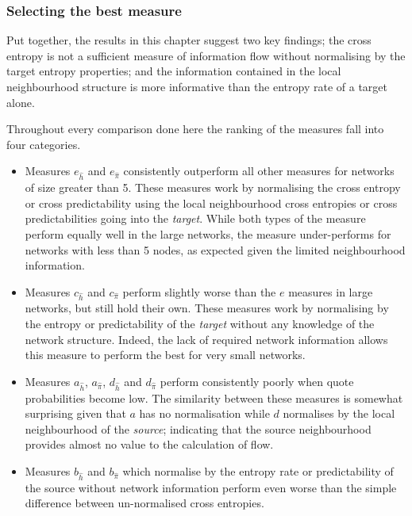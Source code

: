 \subsubsection{Selecting the best measure}
Put together, the results in this chapter suggest two key findings; the cross entropy is not a sufficient measure of information flow without normalising by the target entropy properties; and the information contained in the local neighbourhood structure is more informative than the entropy rate of a target alone.

Throughout every comparison done here the ranking of the measures fall into four categories.
\begin{itemize}
\item Measures $e_{\hat{h}}$ and $e_{\hat{\pi}}$ consistently outperform all other measures for networks of size greater than 5. These measures work by normalising the cross entropy or cross predictability using the local neighbourhood cross entropies or cross predictabilities going into the \emph{target}. While both types of the measure perform equally well in the large networks, the measure under-performs for networks with less than 5 nodes, as expected given the limited neighbourhood information.

\item Measures $c_{\hat{h}}$ and $c_{\hat{\pi}}$ perform slightly worse than the $e$ measures in large networks, but still hold their own. These measures work by normalising by the entropy or predictability of the \emph{target} without any knowledge of the network structure. Indeed, the lack of required network information allows this measure to perform the best for very small networks.

\item Measures $a_{\hat{h}}$,  $a_{\hat{\pi}}$, $d_{\hat{h}}$ and $d_{\hat{\pi}}$ perform consistently poorly when quote probabilities become low. The similarity between these measures is somewhat surprising given that $a$ has no normalisation while $d$ normalises by the local neighbourhood of the \emph{source}; indicating that the source neighbourhood provides almost no value to the calculation of flow.

\item Measures $b_{\hat{h}}$ and $b_{\hat{\pi}}$ which normalise by the entropy rate or predictability of the source without network information perform even worse than the simple difference between un-normalised cross entropies. 
\end{itemize}


